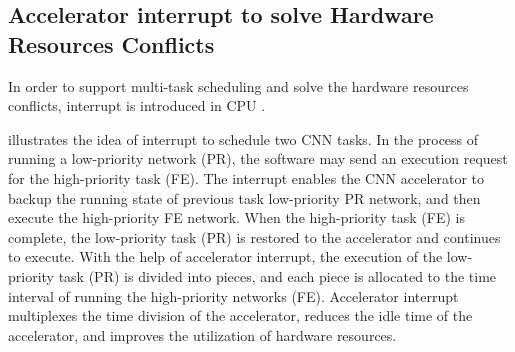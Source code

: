

\subsection{ Accelerator interrupt to solve Hardware Resources Conflicts }

In order to support multi-task scheduling and solve the hardware resources conflicts, interrupt is introduced in CPU \cite{jen1974processor}. 


 illustrates the idea of interrupt to schedule two CNN tasks. In the process of running a low-priority network (PR), the software may send an execution request for the high-priority task (FE). The interrupt enables the CNN accelerator to backup the running state of previous task low-priority PR network, and then execute the high-priority FE network. When the high-priority task (FE) is complete, the low-priority task (PR) is restored to the accelerator and continues to execute.
With the help of accelerator interrupt, the execution of the low-priority task (PR) is divided into pieces, and each piece is allocated to the time interval of running the high-priority networks (FE). 
Accelerator interrupt multiplexes the time division of the accelerator, reduces the idle time of the accelerator, and improves the utilization of hardware resources. 


